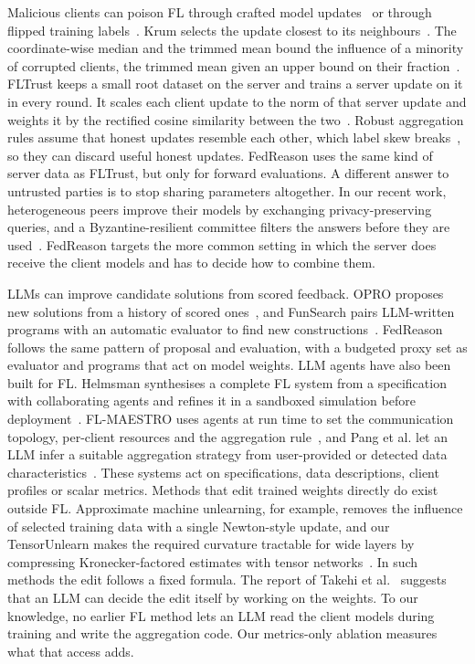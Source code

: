 \documentclass[3p,times,a4paper]{elsarticle}
\begin{document}
Malicious clients can poison FL through crafted model updates~\cite{fang2020local} or through flipped training labels~\cite{tolpegin2020data}. Krum selects the update closest to its neighbours~\cite{blanchard2017krum}. The coordinate-wise median and the trimmed mean bound the influence of a minority of corrupted clients, the trimmed mean given an upper bound on their fraction~\cite{yin2018byzantine}. FLTrust keeps a small root dataset on the server and trains a server update on it in every round. It scales each client update to the norm of that server update and weights it by the rectified cosine similarity between the two~\cite{cao2021fltrust}. Robust aggregation rules assume that honest updates resemble each other, which label skew breaks~\cite{li2019rsa}, so they can discard useful honest updates. FedReason uses the same kind of server data as FLTrust, but only for forward evaluations. A different answer to untrusted parties is to stop sharing parameters altogether. In our recent work, heterogeneous peers improve their models by exchanging privacy-preserving queries, and a Byzantine-resilient committee filters the answers before they are used~\cite{ruzbahani2026trustless}. FedReason targets the more common setting in which the server does receive the client models and has to decide how to combine them.

LLMs can improve candidate solutions from scored feedback. OPRO proposes new solutions from a history of scored ones~\cite{yang2024opro}, and FunSearch pairs LLM-written programs with an automatic evaluator to find new constructions~\cite{romeraparedes2024funsearch}. FedReason follows the same pattern of proposal and evaluation, with a budgeted proxy set as evaluator and programs that act on model weights. LLM agents have also been built for FL. Helmsman synthesises a complete FL system from a specification with collaborating agents and refines it in a sandboxed simulation before deployment~\cite{li2025helmsman}. FL-MAESTRO uses agents at run time to set the communication topology, per-client resources and the aggregation rule~\cite{wu2026flmaestro}, and Pang et al. let an LLM infer a suitable aggregation strategy from user-provided or detected data characteristics~\cite{pang2026automating}. These systems act on specifications, data descriptions, client profiles or scalar metrics. Methods that edit trained weights directly do exist outside FL. Approximate machine unlearning, for example, removes the influence of selected training data with a single Newton-style update, and our TensorUnlearn makes the required curvature tractable for wide layers by compressing Kronecker-factored estimates with tensor networks~\cite{ruzbahani2026tensorunlearn}. In such methods the edit follows a fixed formula. The report of Takehi et al.~\cite{takehi2026sparks} suggests that an LLM can decide the edit itself by working on the weights. To our knowledge, no earlier FL method lets an LLM read the client models during training and write the aggregation code. Our metrics-only ablation measures what that access adds.
\end{document}
